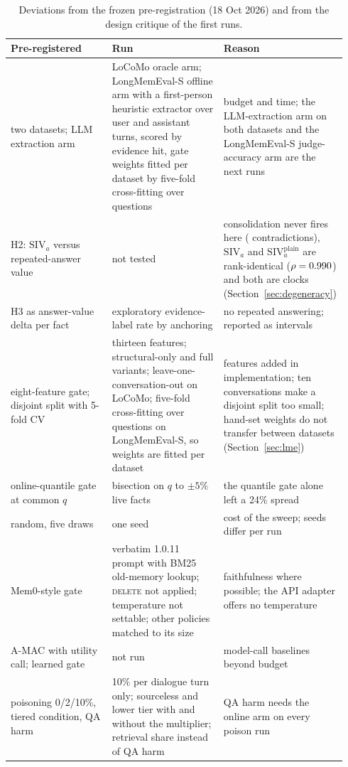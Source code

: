 \documentclass{ceurart}
\newcommand{\SIVa}{\mathrm{SIV}_a}
\newcommand{\SIVaplain}{\mathrm{SIV}_a^{\mathrm{plain}}}
\begin{document}
\begin{table}[tp]
  \centering
  \caption{Deviations from the frozen pre-registration (18 Oct 2026) and from the design critique of the first runs.}
  \label{tab:deviations}
  \small
  \begin{tabular}{@{}p{0.3\linewidth}p{0.33\linewidth}p{0.31\linewidth}@{}}
    \toprule
    Pre-registered & Run & Reason \\
    \midrule
    two datasets; LLM extraction arm & LoCoMo oracle arm; LongMemEval-S offline arm with a first-person heuristic extractor over user and assistant turns, scored by evidence hit, gate weights fitted per dataset by five-fold cross-fitting over questions & budget and time; the LLM-extraction arm on both datasets and the LongMemEval-S judge-accuracy arm are the next runs \\
    H2: $\SIVa$ versus repeated-answer value & not tested & consolidation never fires here (\extInvalidations{} contradictions), $\SIVa$ and $\SIVaplain$ are rank-identical ($\rho=0.990$) and both are clocks (Section~\ref{sec:degeneracy}) \\
    H3 as answer-value delta per fact & exploratory evidence-label rate by anchoring & no repeated answering; reported as intervals \\
    eight-feature gate; disjoint split with 5-fold CV & thirteen features; structural-only and full variants; leave-one-conversation-out on LoCoMo; five-fold cross-fitting over questions on LongMemEval-S, so weights are fitted per dataset & features added in implementation; ten conversations make a disjoint split too small; hand-set weights do not transfer between datasets (Section~\ref{sec:lme}) \\
    online-quantile gate at common $q$ & bisection on $q$ to $\pm5\%$ live facts & the quantile gate alone left a 24\% spread \\
    random, five draws & one seed & cost of the sweep; seeds differ per run \\
    Mem0-style gate & verbatim 1.0.11 prompt with BM25 old-memory lookup; \textsc{delete} not applied; temperature not settable; other policies matched to its size & faithfulness where possible; the API adapter offers no temperature \\
    A-MAC with utility call; learned gate & not run & model-call baselines beyond budget \\
    poisoning 0/2/10\%, tiered condition, QA harm & 10\% per dialogue turn only; sourceless and lower tier with and without the multiplier; retrieval share instead of QA harm & QA harm needs the online arm on every poison run \\
\end{tabular}
\end{table}
\end{document}

